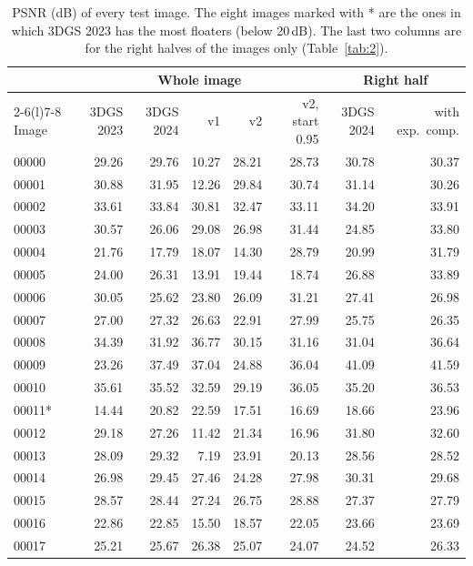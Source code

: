 \documentclass[11pt,a4paper]{article}
\begin{document}
\begin{table}[H]
\centering
\caption{PSNR (dB) of every test image. The eight images marked with * are the ones in which 3DGS 2023 has the most floaters (below 20\,dB). The last two columns are for the right halves of the images only (Table~\ref{tab:2}).}
\label{tab:4}
\footnotesize
\setlength{\tabcolsep}{4pt}
\begin{tabular}{@{}lrrrrrrr@{}}
\toprule
 & \multicolumn{5}{c}{Whole image} & \multicolumn{2}{c}{Right half} \\
\cmidrule(lr){2-6}\cmidrule(l){7-8}
Image & 3DGS 2023 & 3DGS 2024 & v1 & v2 & v2, start 0.95 & 3DGS 2024 & with exp.\ comp. \\
\midrule
00000 & 29.26 & 29.76 & 10.27 & 28.21 & 28.73 & 30.78 & 30.37 \\
00001 & 30.88 & 31.95 & 12.26 & 29.84 & 30.74 & 31.14 & 30.26 \\
00002 & 33.61 & 33.84 & 30.81 & 32.47 & 33.11 & 34.20 & 33.91 \\
00003 & 30.57 & 26.06 & 29.08 & 26.98 & 31.44 & 24.85 & 33.80 \\
00004 & 21.76 & 17.79 & 18.07 & 14.30 & 28.79 & 20.99 & 31.79 \\
00005 & 24.00 & 26.31 & 13.91 & 19.44 & 18.74 & 26.88 & 33.89 \\
00006 & 30.05 & 25.62 & 23.80 & 26.09 & 31.21 & 27.41 & 26.98 \\
00007 & 27.00 & 27.32 & 26.63 & 22.91 & 27.99 & 25.75 & 26.35 \\
00008 & 34.39 & 31.92 & 36.77 & 30.15 & 31.16 & 31.04 & 36.64 \\
00009 & 23.26 & 37.49 & 37.04 & 24.88 & 36.04 & 41.09 & 41.59 \\
00010 & 35.61 & 35.52 & 32.59 & 29.19 & 36.05 & 35.20 & 36.53 \\
00011* & 14.44 & 20.82 & 22.59 & 17.51 & 16.69 & 18.66 & 23.96 \\
00012 & 29.18 & 27.26 & 11.42 & 21.34 & 16.96 & 31.80 & 32.60 \\
00013 & 28.09 & 29.32 & 7.19 & 23.91 & 20.13 & 28.56 & 28.52 \\
00014 & 26.98 & 29.45 & 27.46 & 24.28 & 27.98 & 30.31 & 29.68 \\
00015 & 28.57 & 28.44 & 27.24 & 26.75 & 28.88 & 27.37 & 27.79 \\
00016 & 22.86 & 22.85 & 15.50 & 18.57 & 22.05 & 23.66 & 23.69 \\
00017 & 25.21 & 25.67 & 26.38 & 25.07 & 24.07 & 24.52 & 26.33 \\

\end{tabular}
\end{table}
\end{document}

